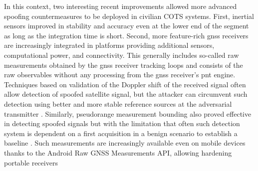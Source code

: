In this context, two interesting recent improvements allowed more advanced spoofing countermeasures to be deployed in civilian COTS systems. First, inertial sensors improved in stability and accuracy even at the lower end of the segment as long as the integration time is short. Second, more feature-rich \gls{gnss} receivers are increasingly integrated in platforms providing additional sensors, computational power, and connectivity. %
This generally includes so-called raw measurements obtained by the \gls{gnss} receiver tracking loops and consists of the raw observables without any processing from the \gls{gnss} receiver's \gls{pnt} engine. Techniques based on validation of the Doppler shift of the received signal often allow detection of spoofed satellite signal, but the attacker can circumvent such detection using better and more stable reference sources at the adversarial transmitter \cite{PapadimitratosJ:C:2008}. Similarly, pseudorange measurement bounding also proved effective in detecting spoofed signals but with the limitation that often such detection system is dependent on a first acquisition in a benign scenario to establish a baseline \cite{PapadimitratosJa:C:2008,Jovanovic2014MultitestDA}. Such measurements are increasingly available even on mobile devices thanks to the Android Raw GNSS Measurements API, allowing hardening portable receivers \cite{WOS:000545000100015,10081330,Spensnavi.537}

